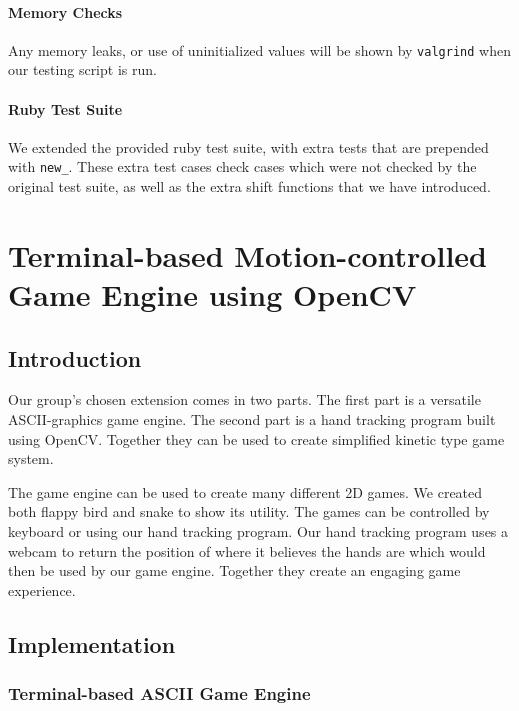 \documentclass[10pt]{article}
\begin{document}
\paragraph{Memory Checks}
Any memory leaks, or use of uninitialized values will be shown by \texttt{valgrind} when our testing script is run.

\paragraph{Ruby Test Suite}
We extended the provided ruby test suite, with extra tests that are prepended with \texttt{new\_}. These extra test cases check cases which were not checked by the original test suite, as well as the extra shift functions that we have introduced.

\section{Terminal-based Motion-controlled Game Engine using OpenCV}

\subsection{Introduction}

Our group’s chosen extension comes in two parts. The first part is a versatile ASCII-graphics game engine. The second part is a hand tracking program built using OpenCV. Together they can be used to create simplified kinetic type game system. 

The game engine can be used to create many different 2D games. We created both flappy bird and snake to show its utility. The games can be controlled by keyboard or using our hand tracking program. Our hand tracking program uses a webcam to return the position of where it believes the hands are which would then be used by our game engine. Together they create an engaging game experience.

\subsection{Implementation}

\subsubsection{Terminal-based ASCII Game Engine}
\end{document}
